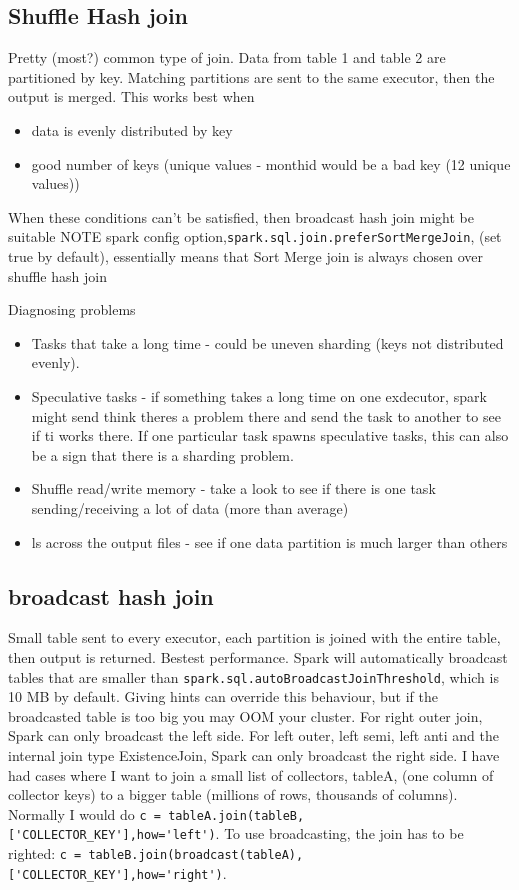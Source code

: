 \documentclass{article}
\begin{document}
    \subsection{Shuffle Hash join}
    Pretty (most?) common type of join. Data from table 1 and table 2 are partitioned by key. Matching partitions are sent to the same executor, then the output is merged.
    This works best when
    \begin{itemize}
        \item data is evenly distributed by key
        \item good number of keys (unique values - monthid would be a bad key (12 unique values))
    \end{itemize}
    When these conditions can't be satisfied, then broadcast hash join might be suitable
    NOTE spark config option,\verb|spark.sql.join.preferSortMergeJoin|, (set true by default), essentially means that Sort Merge join is always chosen over shuffle hash join


    Diagnosing problems
    \begin{itemize}
        \item Tasks that take a long time - could be uneven sharding (keys not distributed evenly).
        \item Speculative tasks - if something takes a long time on one exdecutor, spark might send think theres a problem there and send the task to another to see if ti works there. If one particular task spawns speculative tasks, this can also be a sign that there is a sharding problem.
        \item Shuffle read/write memory - take a look to see if there is one task sending/receiving a lot of data (more than average)
        \item ls across the output files - see if one data partition is much larger than others
    \end{itemize}

    \subsection{broadcast hash join}
    Small table sent to every executor, each partition is joined with the entire table, then output is returned. Bestest performance. Spark will automatically broadcast tables that are smaller than \verb|spark.sql.autoBroadcastJoinThreshold|, which is 10 MB by default. Giving hints can override this behaviour, but if the broadcasted table is too big you may OOM your cluster.
    For right outer join, Spark can only broadcast the left side. For left outer, left semi, left anti and the internal join type ExistenceJoin, Spark can only broadcast the right side. I have had cases where I want to join a small list of collectors, tableA, (one column of collector keys) to a bigger table (millions of rows, thousands of columns). Normally I would do \verb|c = tableA.join(tableB,['COLLECTOR_KEY'],how='left')|. To use broadcasting, the join has to be righted: \verb|c = tableB.join(broadcast(tableA),['COLLECTOR_KEY'],how='right')|. 
\end{document}
